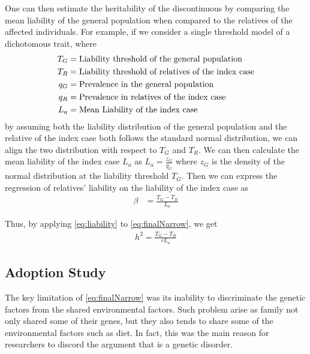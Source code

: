 	One can then estimate the heritability of the discontinuous by comparing the mean liability of the general population when compared to the relatives of the affected individuals.	
	For example, if we consider a single threshold model of a dichotomous trait, where 
	\begin{align}
	T_G &= \text{Liability threshold of the general population}\notag\\
	T_R &= \text{Liability threshold of relatives of the index case} \notag\\
	q_G &= \text{Prevalence in the general population}\notag\\
	q_R &= \text{Prevalence in relatives of the index case}\notag\\
	L_a &= \text{Mean Liability of the index case} \notag
	\end{align}
	by assuming both the liability distribution of the general population and the relative of the index case both follows the standard normal distribution, we can align the two distribution with respect to $T_G$ and $T_R$. 
	We can then calculate the mean liability of the index case $L_a$ as $L_a=\frac{z_G}{q_G}$ where $z_G$ is the density of the normal distribution at the liability threshold $T_G$.
	Then we can express the regression of relatives' liability on the liability of the index case as
	\begin{align}
	\beta &= \frac{T_G-T_R}{L_a}
	\label{eq:liability}
	\end{align}
	
	Thus, by applying \cref{eq:liability} to \cref{eq:finalNarrow}, we get
	\begin{align}
	h^2 =\frac{T_G-T_R}{rL_a}
	\end{align}
	
	\subsection{Adoption Study}
	The key limitation of \cref{eq:finalNarrow} was its inability to discriminate the genetic factors from the shared environmental factors.
	Such problem arise as family not only shared some of their genes, but they also tends to share some of the environmental factors such as diet. 
	In fact, this was the main reason for researchers to discord the argument that  is a genetic disorder.
	
